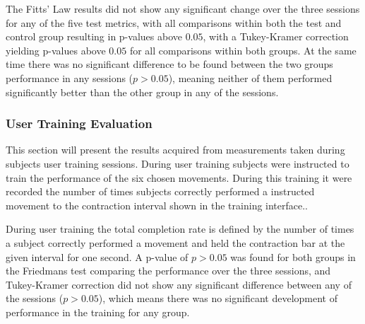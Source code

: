 %
\begin{multicols}{2}
	
The Fitts' Law results did not show any significant change over the three sessions for any of the five test metrics, with all comparisons within both the test and control group resulting in p-values above $0.05$, with a Tukey-Kramer correction yielding p-values above $0.05$ for all comparisons within both groups. At the same time there was no significant difference to be found between the two groups performance in any sessions ($p > 0.05$), meaning neither of them performed significantly better than the other group in any of the sessions.

\subsubsection*{User Training Evaluation} \label{sec:R:userTraining}

This section will present the results acquired from measurements taken during subjects user training sessions. During user training subjects were instructed to train the performance of the six chosen movements. During this training it were recorded the number of times subjects correctly performed a instructed movement to the contraction interval shown in the training interface..  

During user training the total completion rate is defined by the number of times a subject correctly performed a movement and held the contraction bar at the given interval for one second. A p-value of $p > 0.05$ was found for both groups in the Friedmans test comparing the performance over the three sessions, and Tukey-Kramer correction did not show any significant difference between any of the sessions ($p > 0.05$), which means there was no significant development of performance in the training for any group. 


\end{multicols}
